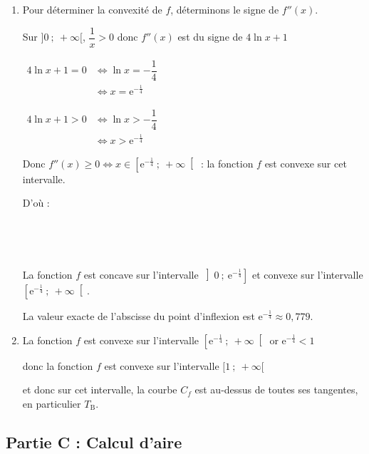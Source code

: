 \documentclass[10pt]{article}
\providecommand{\e}{{\mathrm{e}}}
\begin{document}
\begin{enumerate}
\begin{enumerate}
On sait que $u$ étant une fonction de $x$ dérivable $\left(u^n\right)' = n u'u^{n-1}$

Donc pour tout $x$ appartenant à $]0~;~ +\infty[$:

$f''(x)= 2 \times 2 \ln x \times \dfrac{1}{x} + \dfrac{1}{x}-0 =\dfrac{1}{x}(4 \ln x + 1)$.

	\item Pour déterminer la convexité de $f$, déterminons le signe de $f''(x)$.

Sur $]0~;~+\infty[$, $\dfrac{1}{x} > 0$ donc $f''(x)$ est du signe de  $4 \ln x+1 $

$\begin{aligned} 4 \ln x+1 =0&  \iff \ln x = -\dfrac{1}{4}\\
	&\iff x = \e^{-\frac{1}{4}}
\end{aligned}$

$\begin{aligned} 4 \ln x+1 > 0& \iff \ln x > -\dfrac{1}{4}\\
			&\iff x > \e^{-\frac{1}{4}}
\end{aligned}$

Donc $f''(x) \geqslant 0 \iff x \in \left[\e^{-\frac{1}{4}}~;~+ \infty\right[$ : la fonction $f$ est convexe sur cet intervalle.

D'où :

\hfill~\hfill~

La fonction $f$ est concave sur  l'intervalle $\left]0~;~ \e^{-\frac{1}{4}}\right]$ et convexe sur l'intervalle $\left[ \e^{-\frac{1}{4}}~;~+\infty\right[$.

La valeur exacte de l'abscisse du point d'inflexion est $\e^{-\frac{1}{4}} \approx 0,779$.

		\item La fonction $f$ est convexe sur l'intervalle $\left[ \e^{-\frac{1}{4}}~;~+\infty\right[$
or $\e^{-\frac{1}{4}} <1$

donc la fonction $f$ est  convexe sur l'intervalle $[1~;~+\infty[$

et donc sur cet intervalle, la courbe $C_{f}$ est au-dessus de toutes ses tangentes, en particulier $T_{\mathrm{B}}$.
	\end{enumerate}
\end{enumerate}

\subsection*{Partie C : Calcul d'aire}
\end{document}
